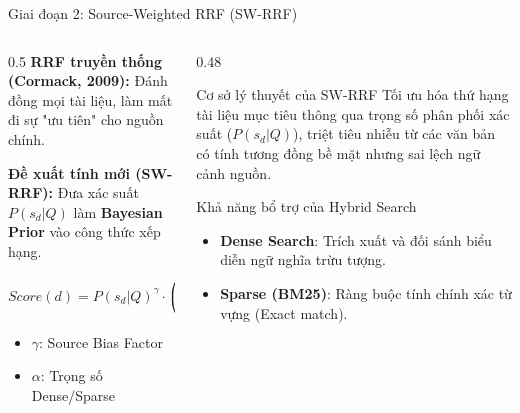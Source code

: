 \documentclass[aspectratio=169,11pt]{beamer}
\begin{document}
\begin{frame}{Giai đoạn 2: Source-Weighted RRF (SW-RRF)}
\small
\begin{columns}[T]
\begin{column}{0.5\textwidth}
\textbf{RRF truyền thống (Cormack, 2009):}
Đánh đồng mọi tài liệu, làm mất đi sự "ưu tiên" cho nguồn chính.

\vspace{0.2cm}
\textbf{Đề xuất tính mới (SW-RRF):}
Đưa xác suất $P(s_d|Q)$ làm \textbf{Bayesian Prior} vào công thức xếp hạng.

\vspace{-0.2cm}
{\footnotesize $$\boxed{Score(d) = P(s_d|Q)^\gamma \cdot \left( \frac{\alpha}{k + r_{dense}} + \frac{1-\alpha}{k + r_{sparse}} \right)}$$}

\begin{itemize}
    \item $\gamma$: Source Bias Factor
    \item $\alpha$: Trọng số Dense/Sparse
\end{itemize}
\end{column}
\begin{column}{0.48\textwidth}
\begin{block}{Cơ sở lý thuyết của SW-RRF}
Tối ưu hóa thứ hạng tài liệu mục tiêu thông qua trọng số phân phối xác suất ($P(s_d|Q)$), triệt tiêu nhiễu từ các văn bản có tính tương đồng bề mặt nhưng sai lệch ngữ cảnh nguồn.
\end{block}

\vspace{0.1cm}
\begin{exampleblock}{Khả năng bổ trợ của Hybrid Search}
\begin{itemize}
    \item \textbf{Dense Search}: Trích xuất và đối sánh biểu diễn ngữ nghĩa trừu tượng.
    \item \textbf{Sparse (BM25)}: Ràng buộc tính chính xác từ vựng (Exact match).
\end{itemize}
\end{exampleblock}
\end{column}
\end{columns}
\end{frame}
\end{document}
